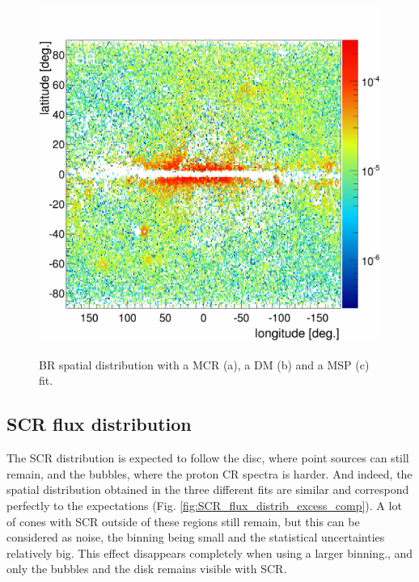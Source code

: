 \begin{figure}[h]
\begin{minipage}[h]{0.4\textwidth}
	  \label{}
  \end{minipage}
  \hfill
  \begin{minipage}[h]{0.4\textwidth}
	  \centering
	  \includegraphics[width=1.\linewidth]{pic/discussion/MSPonly_fine_BR_integral_distribution.png}
	  \label{}
  \end{minipage}
  \caption[BR spatial distributions.]{BR spatial distribution with a MCR (a), a DM (b) and a MSP (c) fit.}
  \label{fig:BR_flux_distrib_excess_comp}	 
\end{figure}
\newpage
\subsection{SCR flux distribution}

The SCR distribution is expected to follow the disc, where point sources can still remain, and the bubbles, where the proton CR spectra is harder. And indeed, the spatial distribution obtained in the three different fits are similar and correspond perfectly to the expectations (Fig. \ref{fig:SCR_flux_distrib_excess_comp}). A lot of cones with SCR outside of these regions still remain, but this can be considered as noise, the binning being small and the statistical uncertainties relatively big. This effect disappears completely when using a larger binning., and only the bubbles and the disk remains visible with SCR.


